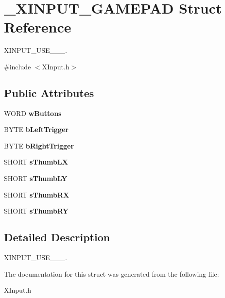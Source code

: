 \hypertarget{struct___x_i_n_p_u_t___g_a_m_e_p_a_d}{}\section{\+\_\+\+X\+I\+N\+P\+U\+T\+\_\+\+G\+A\+M\+E\+P\+A\+D Struct Reference}
\label{struct___x_i_n_p_u_t___g_a_m_e_p_a_d}


X\+I\+N\+P\+U\+T\+\_\+\+U\+S\+E\+\_\+\_\+\_.  




{\ttfamily \#include $<$X\+Input.\+h$>$}

\subsection*{Public Attributes}
\begin{DoxyCompactItemize}
\item 
\hypertarget{struct___x_i_n_p_u_t___g_a_m_e_p_a_d_aa67905941abea0fac79e57b4fb8b5124}{}W\+O\+R\+D {\bfseries w\+Buttons}\label{struct___x_i_n_p_u_t___g_a_m_e_p_a_d_aa67905941abea0fac79e57b4fb8b5124}

\item 
\hypertarget{struct___x_i_n_p_u_t___g_a_m_e_p_a_d_a50480b9dd5f9d0f5db9d47358c66b0da}{}B\+Y\+T\+E {\bfseries b\+Left\+Trigger}\label{struct___x_i_n_p_u_t___g_a_m_e_p_a_d_a50480b9dd5f9d0f5db9d47358c66b0da}

\item 
\hypertarget{struct___x_i_n_p_u_t___g_a_m_e_p_a_d_a065347fca7403ff5c399b21af5a0e1f3}{}B\+Y\+T\+E {\bfseries b\+Right\+Trigger}\label{struct___x_i_n_p_u_t___g_a_m_e_p_a_d_a065347fca7403ff5c399b21af5a0e1f3}

\item 
\hypertarget{struct___x_i_n_p_u_t___g_a_m_e_p_a_d_acab2d1e1bda5277f4cbd9abdf6b82066}{}S\+H\+O\+R\+T {\bfseries s\+Thumb\+L\+X}\label{struct___x_i_n_p_u_t___g_a_m_e_p_a_d_acab2d1e1bda5277f4cbd9abdf6b82066}

\item 
\hypertarget{struct___x_i_n_p_u_t___g_a_m_e_p_a_d_ad0c91ee8c26e828438bacb475f9c5ec3}{}S\+H\+O\+R\+T {\bfseries s\+Thumb\+L\+Y}\label{struct___x_i_n_p_u_t___g_a_m_e_p_a_d_ad0c91ee8c26e828438bacb475f9c5ec3}

\item 
\hypertarget{struct___x_i_n_p_u_t___g_a_m_e_p_a_d_ae6c4c141613af0574fc86a40fdf14405}{}S\+H\+O\+R\+T {\bfseries s\+Thumb\+R\+X}\label{struct___x_i_n_p_u_t___g_a_m_e_p_a_d_ae6c4c141613af0574fc86a40fdf14405}

\item 
\hypertarget{struct___x_i_n_p_u_t___g_a_m_e_p_a_d_a89660a58eda7e822d44abbe1af7aea3b}{}S\+H\+O\+R\+T {\bfseries s\+Thumb\+R\+Y}\label{struct___x_i_n_p_u_t___g_a_m_e_p_a_d_a89660a58eda7e822d44abbe1af7aea3b}

\end{DoxyCompactItemize}


\subsection{Detailed Description}
X\+I\+N\+P\+U\+T\+\_\+\+U\+S\+E\+\_\+\_\+\_. 

The documentation for this struct was generated from the following file\+:\begin{DoxyCompactItemize}
\item 
X\+Input.\+h\end{DoxyCompactItemize}
